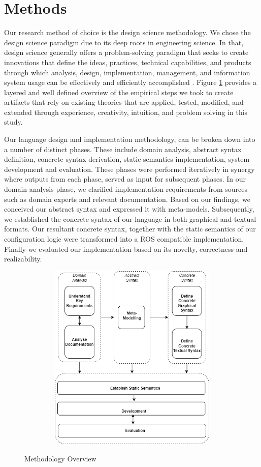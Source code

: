 \documentclass[conference]{IEEEtran}
\begin{document}
\section{Methods}
Our research method of choice is the design science methodology. We chose the design science paradigm due to its deep roots in engineering science. In that, design science generally offers a problem-solving paradigm that seeks to create innovations that define the ideas, practices, technical capabilities, and products through which analysis, design, implementation, management, and information system usage can be effectively and efficiently accomplished  \cite{des-res}. Figure \ref{methover} provides a layered and well defined overview of the empirical steps we took to create artifacts that rely on existing theories that are applied, tested, modified, and extended through experience, creativity, intuition, and problem solving in this study.

Our language design and implementation methodology, can be broken down into a number of distinct phases. These include domain analysis, abstract syntax definition, concrete syntax derivation, static semantics implementation, system development and evaluation. These phases were performed iteratively in synergy where outputs from each phase, served as input for subsequent phases. In our domain analysis phase, we clarified implementation requirements from sources such as domain experts and relevant documentation. Based on our findings, we conceived our abstract syntax and expressed it with meta-models. Subsequently, we established the concrete syntax of our language in both graphical and textual formats. Our resultant concrete syntax, together with the static semantics of our configuration logic were transformed into a ROS compatible implementation. Finally we evaluated our implementation based on its novelty, correctness and realizability.

\begin{figure}[H]
\caption{Methodology Overview}
\centering
\includegraphics[keepaspectratio,height=9cm, width=12cm]{diagrams/methods.png}
\label{methover}
\end{figure}
\end{document}
